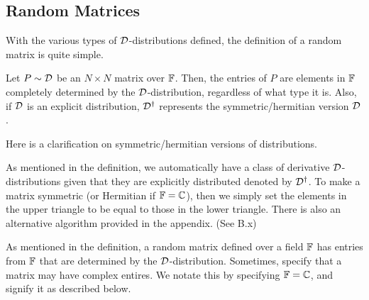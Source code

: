 
\subsection{Random Matrices}

With the various types of $\mathcal{D}$-distributions defined, the definition of a random matrix is quite simple.

\begin{definition}
Let $P \sim \mathcal{D}$ be an $N \times N$ matrix over $\mathbb{F}$. Then, the entries of $P$ are elements in $\mathbb{F}$ completely determined by the $\mathcal{D}$-distribution, regardless of what type it is.
Also, if $\mathcal{D}$ is an explicit distribution, $\mathcal{D}^\dagger$ represents the symmetric/hermitian version $\mathcal{D}$.
\end{definition}


Here is a clarification on symmetric/hermitian versions of distributions.

\begin{remark}
As mentioned in the definition, we automatically have a class of derivative $\mathcal{D}$-distributions given that they are explicitly distributed denoted by $\mathcal{D}^\dagger$. To make a matrix symmetric
(or Hermitian if $\mathbb{F} = \mathbb{C}$), then we simply set the elements in the upper triangle to be equal to those in the lower triangle. There is also an alternative algorithm provided in the appendix. (See B.x)
\end{remark}

As mentioned in the definition, a random matrix defined over a field $\mathbb{F}$ has entries from $\mathbb{F}$ that are determined by the $\mathcal{D}$-distribution.
Sometimes, specify that a matrix may have complex entires. We notate this by specifying $\mathbb{F} = \mathbb{C}$, and signify it as described below.

